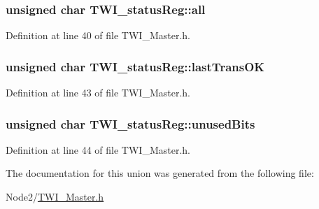 \subsubsection[{\texorpdfstring{all}{all}}]{\setlength{\rightskip}{0pt plus 5cm}unsigned char T\+W\+I\+\_\+status\+Reg\+::all}\hypertarget{union_t_w_i__status_reg_a2c785e2c969f463d0062bb8234f70e1e}{}\label{union_t_w_i__status_reg_a2c785e2c969f463d0062bb8234f70e1e}


Definition at line 40 of file T\+W\+I\+\_\+\+Master.\+h.

\subsubsection[{\texorpdfstring{last\+Trans\+OK}{lastTransOK}}]{\setlength{\rightskip}{0pt plus 5cm}unsigned char T\+W\+I\+\_\+status\+Reg\+::last\+Trans\+OK}\hypertarget{union_t_w_i__status_reg_a98323b7aa41aee4b3fce127337f8eaea}{}\label{union_t_w_i__status_reg_a98323b7aa41aee4b3fce127337f8eaea}


Definition at line 43 of file T\+W\+I\+\_\+\+Master.\+h.

\subsubsection[{\texorpdfstring{unused\+Bits}{unusedBits}}]{\setlength{\rightskip}{0pt plus 5cm}unsigned char T\+W\+I\+\_\+status\+Reg\+::unused\+Bits}\hypertarget{union_t_w_i__status_reg_ad3ab9c3b66a34ac741f6157f6bbd226b}{}\label{union_t_w_i__status_reg_ad3ab9c3b66a34ac741f6157f6bbd226b}


Definition at line 44 of file T\+W\+I\+\_\+\+Master.\+h.



The documentation for this union was generated from the following file\+:\begin{DoxyCompactItemize}
\item 
Node2/\hyperlink{_t_w_i___master_8h}{T\+W\+I\+\_\+\+Master.\+h}\end{DoxyCompactItemize}
